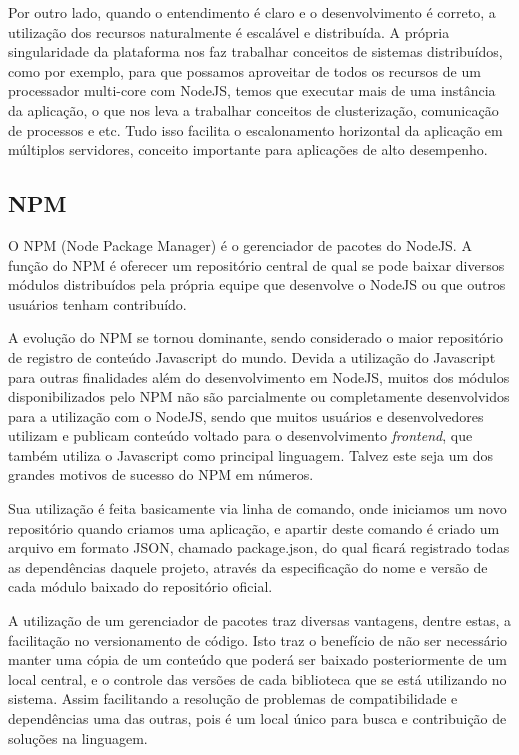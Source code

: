 Por outro lado, quando o entendimento é claro e o desenvolvimento é correto, a utilização dos recursos naturalmente é escalável e distribuída. A própria singularidade da plataforma nos faz trabalhar conceitos de sistemas distribuídos, como por exemplo, para que possamos aproveitar de todos os recursos de um processador multi-core com NodeJS, temos que executar mais de uma instância da aplicação, o que nos leva a trabalhar conceitos de clusterização, comunicação de processos e etc. Tudo isso facilita o escalonamento horizontal da aplicação em múltiplos servidores, conceito importante para aplicações de alto desempenho.

\subsection{NPM}
O NPM (Node Package Manager) \cite{npm} é o gerenciador de pacotes do NodeJS. A função do NPM é oferecer um repositório central de qual se pode baixar diversos módulos distribuídos pela própria equipe que desenvolve o NodeJS ou que outros usuários tenham contribuído.

A evolução do NPM se tornou dominante, sendo considerado o maior repositório de registro de conteúdo Javascript do mundo. Devida a utilização do Javascript para outras finalidades além do desenvolvimento em NodeJS, muitos dos módulos disponibilizados pelo NPM não são parcialmente ou completamente desenvolvidos para a utilização com o NodeJS, sendo que muitos usuários e desenvolvedores utilizam e publicam conteúdo voltado para o desenvolvimento \textit{frontend}, que também utiliza o Javascript como principal linguagem. Talvez este seja um dos grandes motivos de sucesso do NPM em números.

Sua utilização é feita basicamente via linha de comando, onde iniciamos um novo repositório quando criamos uma aplicação, e apartir deste comando é criado um arquivo em formato JSON, chamado package.json, do qual ficará registrado todas as dependências daquele projeto, através da especificação do nome e versão de cada módulo baixado do repositório oficial.

A utilização de um gerenciador de pacotes traz diversas vantagens, dentre estas, a facilitação no versionamento de código. Isto traz o benefício de não ser necessário manter uma cópia de um conteúdo que poderá ser baixado posteriormente de um local central, e o controle das versões de cada biblioteca que se está utilizando no sistema. Assim facilitando a resolução de problemas de compatibilidade e dependências uma das outras, pois é um local único para busca e contribuição de soluções na linguagem.

